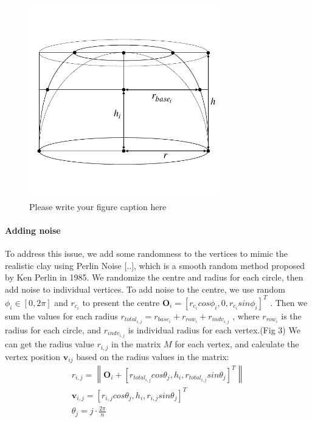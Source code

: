 \begin{figure}
  \includegraphics[width=0.75\textwidth]{f1.pdf}
\caption{Please write your figure caption here}
\label{fig:1}       %
\end{figure}

\paragraph{Adding noise} To address this issue, we add some randomness to the vertices to mimic the realistic clay using Perlin Noise [..], which is a smooth random method proposed by Ken Perlin in 1985. We randomize the centre and radius for each circle, then add noise to individual vertices.
To add noise to the centre, we use random $\phi_{i} \in [0, 2\pi]$ and $r_{c_{i}}$ to present the centre
$\mathbf{O}_{i} = \left[r_{c_{i}}cos\phi_{i}, 0, r_{c_{i}}sin\phi_{i}\right]^T$
. Then we sum the values for each radius
$r_{total_{i,j}} = r_{base_{i}} + r_{row_{i}} + r_{indv_{i,j}}$
, where $r_{row_{i}}$ is the radius for each circle, and $r_{indv_{i,j}}$ is individual radius for each vertex.(Fig 3) We can get the radius value $r_{i,j}$ in the matrix $M$ for each vertex, and calculate the vertex position $\mathbf{v}_{ij}$ based on the radius values in the matrix:
\begin{equation}
\begin{split}
r_{i,j} = \left\|
\mathbf{O}_{i} + \left[ r_{total_{i,j}} cos \theta_{j},
h_{i},
r_{total_{i,j}} sin \theta_{j}
\right]^T
\right\| \\
\mathbf{v}_{i,j} =
\left[r_{i,j}  cos \theta_{j},
h_{i},
r_{i,j} sin \theta_{j}\right]^T \\
\theta_{j} = j \cdot \frac{2\pi}{n}
\end{split}
\end{equation}

